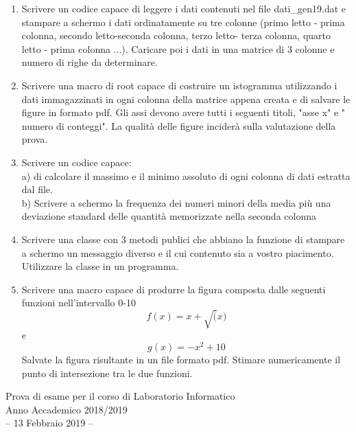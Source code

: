 \documentclass[11pt,fleqn]{book} %
\begin{document}
\begin{enumerate}
\item Scrivere un codice capace di  leggere i dati contenuti nel file  dati\_gen19.dat e stampare a schermo i dati ordinatamente su tre colonne (primo letto - prima colonna, secondo letto-seconda colonna, terzo letto- terza colonna, quarto letto - prima colonna ...). Caricare poi i dati in una matrice di 3 colonne e numero di righe da determinare.

\item Scrivere una macro di root capace di costruire un istogramma utilizzando i dati immagazzinati in ogni colonna della matrice appena creata e di salvare le figure in formato pdf. Gli assi devono avere tutti i seguenti titoli,
"asse x" e " numero di conteggi". La qualità delle figure inciderà sulla valutazione della prova.
 

\item Scrivere un codice capace:\\
     a) di calcolare il massimo e il minimo assoluto di ogni colonna di dati estratta dal file. \\
     b) Scrivere a schermo la frequenza dei numeri minori della media più una deviazione standard delle quantità memorizzate nella seconda colonna\\
  

\item Scrivere una classe con 3 metodi publici che abbiano la funzione di stampare  a schermo un messaggio diverso e il cui contenuto sia a vostro piacimento. Utilizzare la classe in un programma.

\item Scrivere una macro capace di produrre la figura composta dalle seguenti funzioni nell'intervallo 0-10
$$f(x)=x+\sqrt(x)$$ e
$$g(x) = -x^2+10 $$
Salvate la figura risultante in un file formato pdf.
Stimare numericamente il punto di intersezione tra le due funzioni.

\end{enumerate}

{
\Large\centering
Prova di esame per il corso di Laboratorio Informatico\\		
Anno Accademico 2018/2019\\
-- 13 Febbraio 2019 --\\
}
\end{document}
